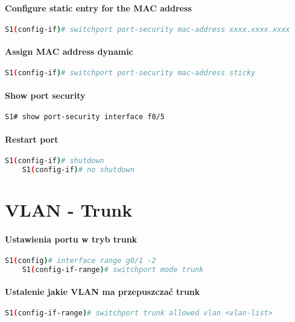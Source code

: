 \documentclass[12pt]{article}
\begin{document}
	\paragraph{Configure static entry for the MAC address}
	\begin{lstlisting}[language=bash]
	S1(config-if)# switchport port-security mac-address xxxx.xxxx.xxxx 
	\end{lstlisting}
		
	\paragraph{Assign MAC address dynamic}
	\begin{lstlisting}[language=bash]
	S1(config-if)# switchport port-security mac-address sticky
	\end{lstlisting}
		
	\paragraph{Show port security}
	\begin{lstlisting}[language=bash]
	S1# show port-security interface f0/5
	\end{lstlisting}
		
	\paragraph{Restart port}
	\begin{lstlisting}[language=bash]
	S1(config-if)# shutdown
	S1(config-if)# no shutdown
	\end{lstlisting}
		
		
\newpage
	
\section{VLAN - Trunk}
	\paragraph{Ustawienia portu w tryb trunk}
	\begin{lstlisting}[language=bash]
	S1(config)# interface range g0/1 -2
	S1(config-if-range)# switchport mode trunk 
	\end{lstlisting}
		
	\paragraph{Ustalenie jakie VLAN ma przepuszczać trunk}
	\begin{lstlisting}[language=bash]
	S1(config-if-range)# switchport trunk allowed vlan <vlan-list>
	\end{lstlisting}
		
\end{document}
